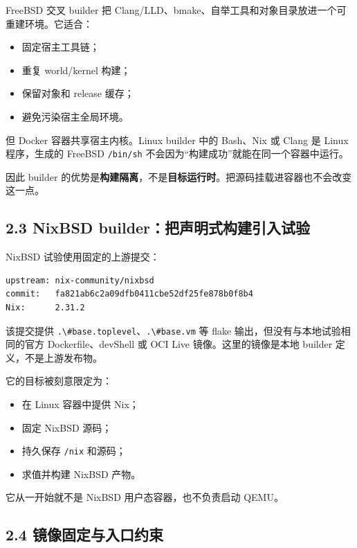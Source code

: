 \documentclass[
  11pt,
  UTF8,
  a4paper,
  fontset=fandol]{ctexart}
\newcommand{\passthrough}[1]{#1}
\providecommand{\tightlist}{%
  \setlength{\itemsep}{0pt}\setlength{\parskip}{0pt}}
\begin{document}
FreeBSD 交叉 builder 把
Clang/LLD、bmake、自举工具和对象目录放进一个可重建环境。它适合：

\begin{itemize}
\tightlist
\item
  固定宿主工具链；
\item
  重复 world/kernel 构建；
\item
  保留对象和 release 缓存；
\item
  避免污染宿主全局环境。
\end{itemize}

但 Docker 容器共享宿主内核。Linux builder 中的 Bash、Nix 或 Clang 是
Linux 程序，生成的 FreeBSD \passthrough{\lstinline!/bin/sh!}
不会因为``构建成功''就能在同一个容器中运行。

因此 builder
的优势是\textbf{构建隔离}，不是\textbf{目标运行时}。把源码挂载进容器也不会改变这一点。

\subsection{2.3 NixBSD
builder：把声明式构建引入试验}\label{nixbsd-builderux628aux58f0ux660eux5f0fux6784ux5efaux5f15ux5165ux8bd5ux9a8c}

NixBSD 试验使用固定的上游提交：

\begin{lstlisting}
upstream: nix-community/nixbsd
commit:   fa821ab6c2a09dfb0411cbe52df25fe878b0f8b4
Nix:      2.31.2
\end{lstlisting}

该提交提供
\passthrough{\lstinline!.\#base.toplevel!}、\passthrough{\lstinline!.\#base.vm!}
等 flake 输出，但没有与本地试验相同的官方 Dockerfile、devShell 或 OCI
Live 镜像。这里的镜像是本地 builder 定义，不是上游发布物。

它的目标被刻意限定为：

\begin{itemize}
\tightlist
\item
  在 Linux 容器中提供 Nix；
\item
  固定 NixBSD 源码；
\item
  持久保存 \passthrough{\lstinline!/nix!} 和源码；
\item
  求值并构建 NixBSD 产物。
\end{itemize}

它从一开始就不是 NixBSD 用户态容器，也不负责启动 QEMU。

\subsection{2.4
镜像固定与入口约束}\label{ux955cux50cfux56faux5b9aux4e0eux5165ux53e3ux7ea6ux675f}
\end{document}

